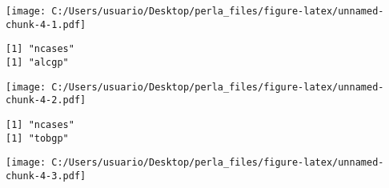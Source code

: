 \documentclass[]{article}
\begin{document}
\texttt{[image: C:/Users/usuario/Desktop/perla\_files/figure-latex/unnamed-chunk-4-1.pdf]}

\begin{verbatim}
[1] "ncases"
[1] "alcgp"
\end{verbatim}

\texttt{[image: C:/Users/usuario/Desktop/perla\_files/figure-latex/unnamed-chunk-4-2.pdf]}

\begin{verbatim}
[1] "ncases"
[1] "tobgp"
\end{verbatim}

\texttt{[image: C:/Users/usuario/Desktop/perla\_files/figure-latex/unnamed-chunk-4-3.pdf]}
\end{document}
